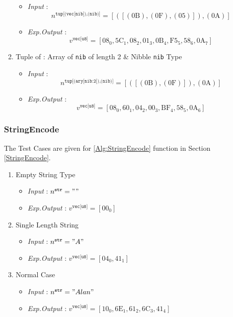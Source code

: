 \documentclass[../alan-handbook.tex]{subfiles}
\begin{document}
\begin{enumerate}
        \begin{itemize}
            \item \textit{Input} : $$n^{\texttt{tup[(vec[nib]),(nib)]}} = [([(\text{0B}),(\text{0F}),(\text{05})]),(\text{0A})]$$
            \item \textit{Exp.Output} : $$v^{\texttt{vec[u8]}} = [\text{08}_0,\text{5C}_1,\text{08}_2,\text{01}_3,\text{0B}_4,\text{F5}_5,\text{58}_6,\text{0A}_7]$$
        \end{itemize}
    \item Tuple of : Array of \texttt{nib} of length 2 \& Nibble \texttt{nib} Type
        \begin{itemize}
            \item \textit{Input} : $$n^{\texttt{tup[(ary[nib:2]),(nib)]}} = [([(\text{0B}),(\text{0F})]),(\text{0A})]$$
            \item \textit{Exp.Output} : $$v^{\texttt{vec[u8]}} = [\text{08}_0,\text{60}_1,\text{04}_2,\text{00}_3,\text{BF}_4,\text{58}_5,\text{0A}_6]$$
        \end{itemize}
\end{enumerate}

\subsubsection{StringEncode} \label{Test:StringEncode}

The Test Cases are given for  \ref{Alg:StringEncode} function in Section \ref{StringEncode}.

\begin{enumerate}
    \item Empty String Type
    \begin{itemize}
        \item \textit{Input} : $n^{\texttt{str}} = "" $
        \item \textit{Exp.Output} : $v^{\texttt{vec[u8]}} = [\text{00}_0]$
    \end{itemize}
    \item Single Length String 
    \begin{itemize}
        \item \textit{Input} : $n^{\texttt{str}} = "A" $
        \item \textit{Exp.Output} : $v^{\texttt{vec[u8]}} = [\text{04}_0,\text{41}_1]$
    \end{itemize}
    \item Normal Case
    \begin{itemize}
        \item \textit{Input} : $n^{\texttt{str}} = "Alan" $
        \item \textit{Exp.Output} : $v^{\texttt{vec[u8]}} = [\text{10}_0,\text{6E}_1,\text{61}_2,\text{6C}_3,\text{41}_4]$
    \end{itemize} 
\end{enumerate}
\end{document}
